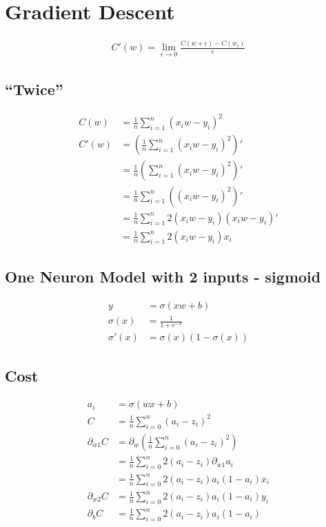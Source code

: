 \documentclass{article}
\numberwithin{equation}{subsection}
\begin{document}
\section{Gradient Descent}

\begin{align}
  C'(w) = \lim_{\epsilon \to 0} \frac{C(w + \epsilon) - C(w_i)}{\epsilon}
\end{align}

\subsection{``Twice''}

\begin{align}
  C(w) &= \frac{1}{n}\sum_{i=1}^{n}(x_iw - y_i)^2\\
  C'(w) &= \left(\frac{1}{n}\sum_{i=1}^{n}(x_iw - y_i)^2\right)'\\
       &= \frac{1}{n} \left(\sum_{i=1}^{n}(x_iw - y_i)^2\right)'\\
       &= \frac{1}{n}\sum_{i=1}^{n} \left((x_iw - y_i)^2\right)'\\
       &= \frac{1}{n}\sum_{i=1}^{n}2(x_iw - y_i)\left(x_iw - y_i\right)'\\
       &= \frac{1}{n}\sum_{i=1}^{n}2(x_iw - y_i)x_i
\end{align}

\subsection{One Neuron Model with 2 inputs - sigmoid}

\begin{align}
  y &= \sigma(xw + b) \\
  \sigma(x) &= \frac{1}{1 + e^{-x}} \\
  \sigma'(x) &= \sigma(x)(1 -  \sigma(x))
\end{align}

\subsection{Cost}

\begin{align}
  a_i &= \sigma(wx + b) \\
  C &= \frac{1}{n} \sum_{i=0}^{n}(a_i - z_i)^2 \\
  \partial_{w1}C &= \partial_w\left(\frac{1}{n} \sum_{i=0}^{n}(a_i-z_i)^2 \right) \\
      &= \frac{1}{n} \sum_{i=0}^{n}2(a_i-z_i)\partial_{w1}a_i \\
      &= \frac{1}{n} \sum_{i=0}^{n}2(a_i-z_i)a_i(1-a_i)x_i \\
  \partial_{w2}C&= \frac{1}{n} \sum_{i=0}^{n}2(a_i-z_i)a_i(1-a_i)y_i \\
  \partial_bC &= \frac{1}{n} \sum_{i=0}^{n}2(a_i-z_i)a_i(1-a_i)
\end{align}
\end{document}
